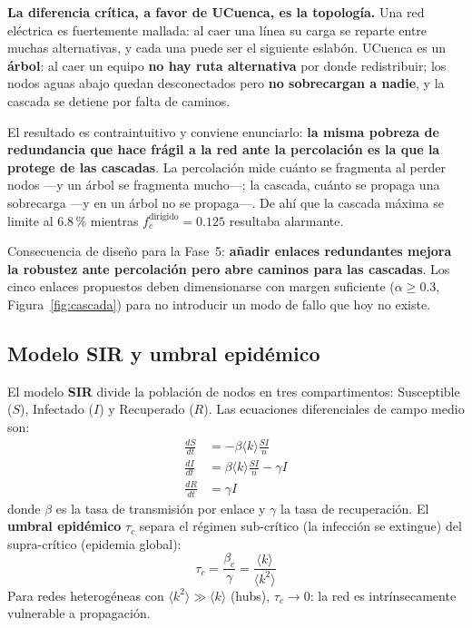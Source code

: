 \documentclass[11pt, a4paper]{article}
\begin{document}
\textbf{La diferencia crítica, a favor de UCuenca, es la topología.} Una red
eléctrica es fuertemente mallada: al caer una línea su carga se reparte
entre muchas alternativas, y cada una puede ser el siguiente eslabón.
UCuenca es un \textbf{árbol}: al caer un equipo \textbf{no hay ruta
alternativa} por donde redistribuir; los nodos aguas abajo quedan
desconectados pero \textbf{no sobrecargan a nadie}, y la cascada se detiene
por falta de caminos.

El resultado es contraintuitivo y conviene enunciarlo: \textbf{la misma
pobreza de redundancia que hace frágil a la red ante la percolación es la
que la protege de las cascadas}. La percolación mide cuánto se fragmenta al
perder nodos —y un árbol se fragmenta mucho—; la cascada, cuánto se propaga
una sobrecarga —y en un árbol no se propaga—. De ahí que la cascada máxima
se limite al $6.8\,\%$ mientras $f_c^{\text{dirigido}} = 0.125$ resultaba
alarmante.

Consecuencia de diseño para la Fase~5: \textbf{añadir enlaces redundantes
mejora la robustez ante percolación pero abre caminos para las cascadas}.
Los cinco enlaces propuestos deben dimensionarse con margen suficiente
($\alpha \geq 0.3$, Figura~\ref{fig:cascada}) para no introducir un modo de
fallo que hoy no existe.

\subsection{Modelo SIR y umbral epidémico}

El modelo \textbf{SIR} divide la población de nodos en tres compartimentos:
Susceptible ($S$), Infectado ($I$) y Recuperado ($R$). Las ecuaciones
diferenciales de campo medio son:
\begin{align*}
  \frac{dS}{dt} &= -\beta \langle k \rangle \frac{SI}{n} \\[3pt]
  \frac{dI}{dt} &= \beta \langle k \rangle \frac{SI}{n} - \gamma I \\[3pt]
  \frac{dR}{dt} &= \gamma I
\end{align*}
donde $\beta$ es la tasa de transmisión por enlace y $\gamma$ la tasa de
recuperación. El \textbf{umbral epidémico} $\tau_c$ separa el régimen
sub-crítico (la infección se extingue) del supra-crítico (epidemia global):
\[
  \tau_c = \frac{\beta_c}{\gamma} = \frac{\langle k \rangle}{\langle k^2 \rangle}
\]
Para redes heterogéneas con $\langle k^2 \rangle \gg \langle k \rangle$
(hubs), $\tau_c \to 0$: la red es intrínsecamente vulnerable a propagación.
\end{document}

